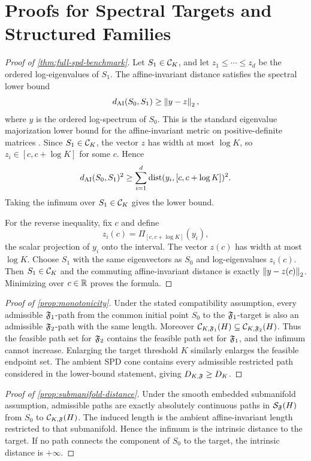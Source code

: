 \section{Proofs for Spectral Targets and Structured Families}
\label{app:matrix-proofs}

\begin{proof}[Proof of \cref{thm:full-spd-benchmark}]
Let \(S_1\in\mathcal C_K\), and let \(z_1\le\cdots\le z_d\) be the ordered
log-eigenvalues of \(S_1\). The affine-invariant distance satisfies the
spectral lower bound
\[
  d_{\mathrm{AI}}(S_0,S_1)\ge \left\lVert y-z\right\rVert_2,
\]
where \(y\) is the ordered log-spectrum of \(S_0\). This is the standard
eigenvalue majorization lower bound for the affine-invariant metric on
positive-definite matrices \cite{bhatia2007positive}. Since \(S_1\in\mathcal C_K\), the
vector \(z\) has width at most \(\log K\), so \(z_i\in[c,c+\log K]\) for some
\(c\). Hence
\[
  d_{\mathrm{AI}}(S_0,S_1)^2
  \ge
  \sum_{i=1}^d \operatorname{dist}(y_i,[c,c+\log K])^2.
\]
Taking the infimum over \(S_1\in\mathcal C_K\) gives the lower bound.

For the reverse inequality, fix \(c\) and define
\[
  z_i(c)=\Pi_{[c,c+\log K]}(y_i),
\]
the scalar projection of \(y_i\) onto the interval. The vector \(z(c)\) has
width at most \(\log K\). Choose \(S_1\) with the same eigenvectors as \(S_0\)
and log-eigenvalues \(z_i(c)\). Then \(S_1\in\mathcal C_K\) and the commuting
affine-invariant distance is exactly \(\left\lVert y-z(c)\right\rVert_2\). Minimizing over
\(c\in\mathbb R\) proves the formula.
\end{proof}

\begin{proof}[Proof of \cref{prop:monotonicity}]
Under the stated compatibility assumption, every admissible \(\mathfrak F_1\)-path from
the common initial point \(S_0\) to the \(\mathfrak F_1\)-target is also an admissible
\(\mathfrak F_2\)-path with the same length. Moreover
\(\mathcal C_{K,\mathfrak F_1}(H)\subseteq\mathcal C_{K,\mathfrak F_2}(H)\). Thus the feasible
path set for \(\mathfrak F_2\) contains the feasible path set for \(\mathfrak F_1\), and the
infimum cannot increase. Enlarging the target threshold \(K\) similarly
enlarges the feasible endpoint set. The ambient SPD cone contains every
admissible restricted path considered in the lower-bound statement, giving
\(D_{K,\mathfrak F}\ge D_K\).
\end{proof}

\begin{proof}[Proof of \cref{prop:submanifold-distance}]
Under the smooth embedded submanifold assumption, admissible paths are exactly
absolutely continuous paths in \(\mathcal S_\mathfrak F(H)\) from \(S_0\) to
\(\mathcal C_{K,\mathfrak F}(H)\). The induced length is the ambient affine-invariant
length restricted to that submanifold. Hence the infimum is the intrinsic
distance to the target. If no path connects the component of \(S_0\) to the
target, the intrinsic distance is \(+\infty\).
\end{proof}

